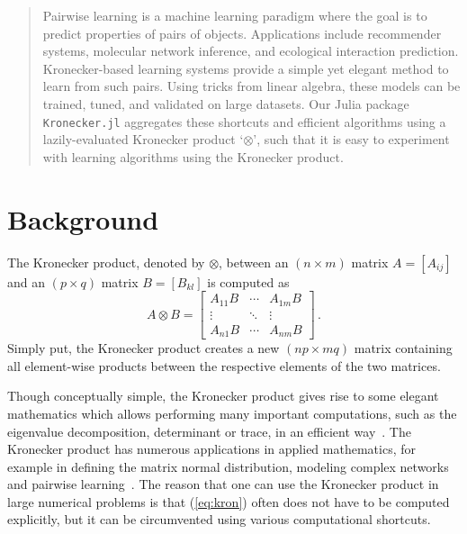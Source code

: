 \documentclass{juliacon}
\begin{document}


\maketitle

\begin{abstract}
Pairwise learning is a machine learning paradigm where the goal is to predict properties of pairs of objects.
Applications include recommender systems, molecular network inference, and ecological interaction prediction.
Kronecker-based learning systems provide a simple yet elegant method to learn from such pairs.
Using tricks from linear algebra, these models can be trained, tuned, and validated on large datasets.
Our Julia package \texttt{Kronecker.jl} aggregates these shortcuts and efficient algorithms using a lazily-evaluated Kronecker product `$\otimes$', such that it is easy to experiment with learning algorithms using the Kronecker product.

\end{abstract}

\section{Background}

The Kronecker product, denoted by $\otimes$, between an $(n\times m)$ matrix $A=[A_{ij}]$ and an $(p\times q)$ matrix $B=[B_{kl}]$ is computed as
\begin{equation}\label{eq:kron}
  {A} \otimes  {B} ={\begin{bmatrix}A_{11} {B} &\cdots &A_{1m} {B} \\\vdots &\ddots &\vdots \\A_{n1} {B} &\cdots &A_{nm} {B} \end{bmatrix}}\,.
\end{equation}
Simply put, the Kronecker product creates a new $(np\times mq)$ matrix containing all element-wise products between the respective elements of the two matrices.

Though conceptually simple, the Kronecker product gives rise to some elegant mathematics which allows performing many important computations, such as the eigenvalue decomposition, determinant or trace, in an efficient way~\cite{Sch2013,VanLoan2000}.
The Kronecker product has numerous applications in applied mathematics, for example in defining the matrix normal distribution, modeling complex networks~\cite{Leskovec2008} and pairwise learning~\cite{Stock2017tskrr}.
The reason that one can use the Kronecker product in large numerical problems is that (\ref{eq:kron}) often does not have to be computed explicitly, but it can be circumvented using various computational shortcuts.
\end{document}
